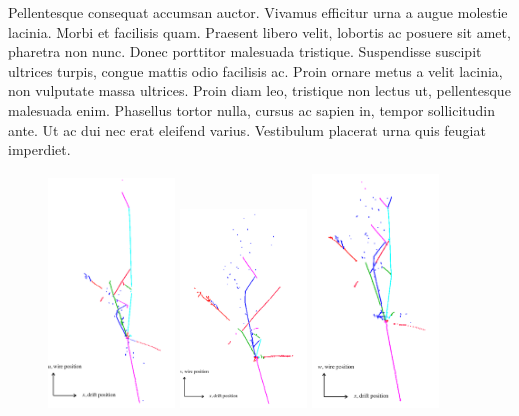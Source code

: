 Pellentesque consequat accumsan auctor. Vivamus efficitur urna a augue molestie lacinia. Morbi et facilisis quam. Praesent libero velit, lobortis ac posuere sit amet, pharetra non nunc. Donec porttitor malesuada tristique. Suspendisse suscipit ultrices turpis, congue mattis odio facilisis ac. Proin ornare metus a velit lacinia, non vulputate massa ultrices. Proin diam leo, tristique non lectus ut, pellentesque malesuada enim. Phasellus tortor nulla, cursus ac sapien in, tempor sollicitudin ante. Ut ac dui nec erat eleifend varius. Vestibulum placerat urna quis feugiat imperdiet.

\begin{figure}
\includegraphics[width=0.3\textwidth]{Figures/EventDisplays/MC/ReconstructionU.pdf}
\includegraphics[width=0.3\textwidth]{Figures/EventDisplays/MC/ReconstructionV.pdf}
\includegraphics[width=0.3\textwidth]{Figures/EventDisplays/MC/ReconstructionW.pdf} \\

\end{figure}
